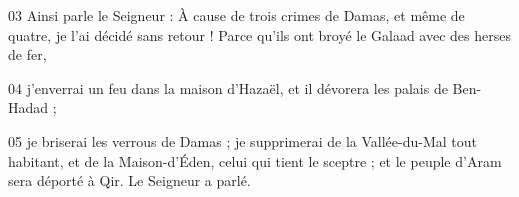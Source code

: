 
03 Ainsi parle le Seigneur : À cause de trois crimes de Damas, et même de quatre, je l’ai décidé sans retour ! Parce qu’ils ont broyé le Galaad avec des herses de fer,

04 j’enverrai un feu dans la maison d’Hazaël, et il dévorera les palais de Ben-Hadad ;

05 je briserai les verrous de Damas ; je supprimerai de la Vallée-du-Mal tout habitant, et de la Maison-d’Éden, celui qui tient le sceptre ; et le peuple d’Aram sera déporté à Qir. Le Seigneur a parlé.
